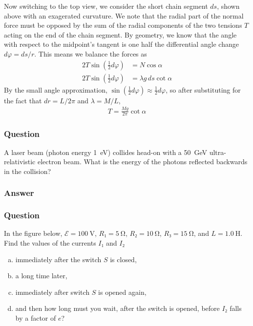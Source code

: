 Now switching to the top view, we consider the short chain segment $ds$, shown
above with an exagerated curvature. We note that the radial part of the
normal force must be opposed by the sum of the radial components of the two
tensions $T$ acting on the end of the chain segment. By geometry, we know that
the angle with respect to the midpoint's tangent is one half the differential
angle change $dφ = ds/r$. This means we balance the forces as
\begin{align*}
    2T\sin(\frac 12 dφ) &= N \cos α \\
    2T\sin(\frac 12 dφ) &= λg\,ds \cot α
\end{align*}
By the small angle approximation, $\sin (\frac 12 dφ) ≈ \frac 12 dφ$, so after
substituting for the fact that $dr = L/2π$ and $λ = M/L$,
\begin{align}
    \boxed{
    T = \frac{Mg}{2π} \cot α
    }
\end{align}

\subsubsection{Question}

A laser beam (photon energy \SI{1}{\eV}) collides head-on with a \SI{50}{\GeV}
ultra-relativistic electron beam. What is the energy of the photons reflected
backwards in the collision?

\subsubsection{Answer}



\subsubsection{Question}

In the figure below, $\mathcal E = \SI{100}{\V}$, $R₁ = \SI{5}{\ohm}$,
$R₂ = \SI{10}{\ohm}$, $R₃ = \SI{15}{\ohm}$, and $L = \SI{1.0}{\henry}$. Find
the values of the currents $I₁$ and $I₂$
\begin{enumerate}[a)]
    \item immediately after the switch $S$ is closed,
    \item a long time later,
    \item immediately after switch $S$ is opened again,
    \item and then how long must you wait, after the switch is opened, before
	$I₂$ falls by a factor of $e$?
\end{enumerate}

